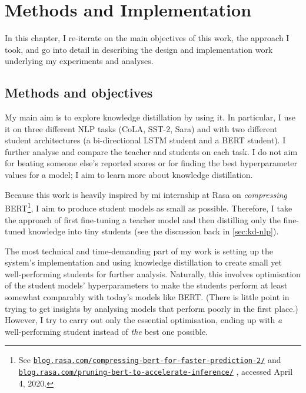 \documentclass[bsc,frontabs,twoside,singlespacing,parskip,deptreport]{infthesis}
\newcommand\rurl[1]{%
  \href{https://#1}{\nolinkurl{#1}}%
}
\begin{document}
\chapter{Methods and Implementation}{
  \label{chap:methods-implementation}

  In this chapter, I re-iterate on the main objectives of this work, the approach I took, and go into detail in describing the design and implementation work underlying my experiments and analyses.

  \section{Methods and objectives}{
    \label{sec:methods}
    My main aim is to explore knowledge distillation by using it. In particular, I use it on three different NLP tasks (CoLA, SST-2, Sara) and with two different student architectures (a bi-directional LSTM student and a BERT student). I further analyse and compare the teacher and students on each task. I do not aim for beating someone else's reported scores or for finding the best hyperparameter values for a model; I aim to learn more about knowledge distillation.

    Because this work is heavily inspired by mi internship at Rasa on \textit{compressing} BERT\footnote{See \rurl{blog.rasa.com/compressing-bert-for-faster-prediction-2/} and \rurl{blog.rasa.com/pruning-bert-to-accelerate-inference/}, accessed April 4, 2020.}, I aim to produce student models as small as possible. Therefore, I take the approach of first fine-tuning a teacher model and then distilling only the fine-tuned knowledge into tiny students (see the discussion back in \autoref{sec:kd-nlp}).

    The most technical and time-demanding part of my work is setting up the system's implementation and using knowledge distillation to create small yet well-performing students for further analysis. Naturally, this involves optimisation of the student models' hyperparameters to make the students perform at least somewhat comparably with today's models like BERT. (There is little point in trying to get insights by analysing models that perform poorly in the first place.) However, I try to carry out only the essential optimisation, ending up with \textit{a} well-performing student instead of \textit{the} best one possible.

}}
\end{document}
